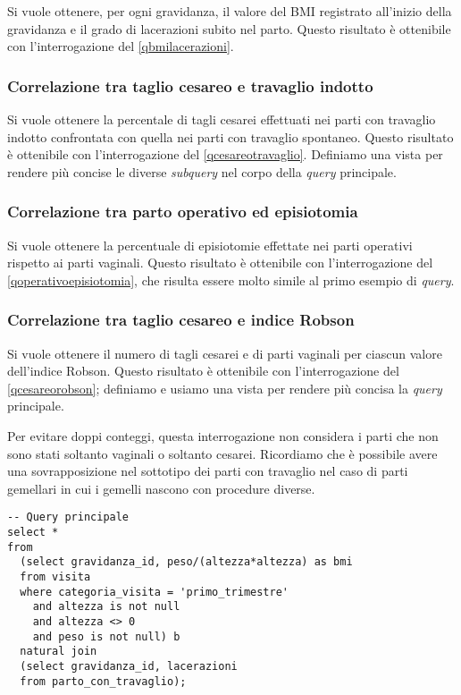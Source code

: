 Si vuole ottenere, per ogni gravidanza, il valore del BMI registrato all'inizio della gravidanza e il grado di lacerazioni subito nel parto.
Questo risultato è ottenibile con l'interrogazione del \lstlistingname{} \ref{qbmilacerazioni}.

\subsubsection{Correlazione tra taglio cesareo e travaglio indotto}

Si vuole ottenere la percentale di tagli cesarei effettuati nei parti con travaglio indotto confrontata con quella nei parti con travaglio spontaneo.
Questo risultato è ottenibile con l'interrogazione del \lstlistingname{} \ref{qcesareotravaglio}.
Definiamo una vista  per rendere più concise le diverse \emph{subquery} nel corpo della \emph{query} principale.

\subsubsection{Correlazione tra parto operativo ed episiotomia}

Si vuole ottenere la percentuale di episiotomie effettate nei parti operativi rispetto ai parti vaginali.
Questo risultato è ottenibile con l'interrogazione del \lstlistingname{} \ref{qoperativoepisiotomia}, che risulta essere molto simile al primo esempio di \emph{query}.

\subsubsection{Correlazione tra taglio cesareo e indice Robson}

Si vuole ottenere il numero di tagli cesarei e di parti vaginali per ciascun valore dell'indice Robson.
Questo risultato è ottenibile con l'interrogazione del \lstlistingname{} \ref{qcesareorobson}; definiamo e usiamo una vista  per rendere più concisa la \emph{query} principale.

Per evitare doppi conteggi, questa interrogazione non considera i parti che non sono stati soltanto vaginali o soltanto cesarei.
Ricordiamo che è possibile avere una sovrapposizione nel sottotipo dei parti con travaglio nel caso di parti gemellari in cui i gemelli nascono con procedure diverse.

\begin{lstlisting}[float,caption={Esempio di \emph{query}. Valori di BMI e lacerazioni.},label=qbmilacerazioni]
-- Query principale
select *
from
  (select gravidanza_id, peso/(altezza*altezza) as bmi
  from visita
  where categoria_visita = 'primo_trimestre'
    and altezza is not null
    and altezza <> 0
    and peso is not null) b
  natural join
  (select gravidanza_id, lacerazioni
  from parto_con_travaglio);
\end{lstlisting}

